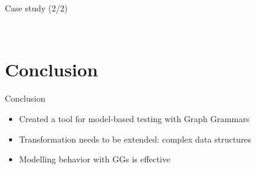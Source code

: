 \documentclass{FMTslides}
\begin{document}
\begin{frame}{Case study (2/2)}
\begin{figure}
\centering
    \hspace{10px}
    \\
    \hspace{10px}
\end{figure}
\end{frame}

\section[Conclusion]{Conclusion}

\begin{frame}{Conclusion}
  \begin{itemize}
    \item Created a tool for model-based testing with Graph Grammars
    \item Transformation needs to be extended: complex data structures
    \item Modelling behavior with GGs is effective
  \end{itemize}
\end{frame}
\end{document}
